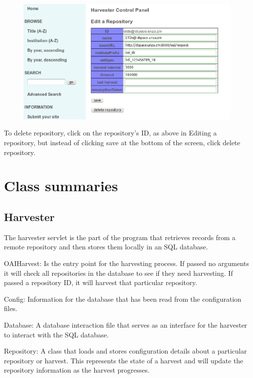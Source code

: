 \documentclass[a4paper,11pt]{article}
\begin{document}
\begin{figure}[h]
 \centering
 \includegraphics[width=\textwidth]{deleting_repository_infomation_x.eps}
\end{figure}

To delete repository, click on the repository's ID, as above in Editing a repository, but instead of clicking save at the bottom of the screen, click delete repository.

\section{Class summaries}

\subsection{Harvester}

The harvester servlet is the part of the program that retrieves records from a remote repository and then stores them locally in an SQL database.

OAIHarvest: Is the entry point for the harvesting process. If passed no arguments it will check all repositories in the database to see if they need harvesting. If passed a repository ID, it will harvest that particular repository.

Config: Information for the database that has been read from the configuration files.

Database: A database interaction file that serves as an interface for the harvester to interact with the SQL database.

Repository: A class that loads and stores configuration details about a particular repository or harvest. This represents the state of a harvest and will update the repository information as the harvest progresses.
\end{document}

